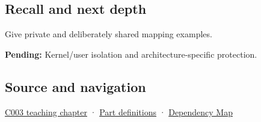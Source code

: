 \subsection{Recall and next depth}\label{appendix-c2a9ad1e2b49-recall-and-next-depth}

Give private and deliberately shared mapping examples.

\textbf{Pending:} Kernel/user isolation and architecture-specific protection.

\subsection{Source and navigation}\label{appendix-c2a9ad1e2b49-source-and-navigation}

\hyperref[01-foundations-i-ch002-where-the-bytes-live]{C003 teaching chapter} · \hyperref[appendix-fd090d982a15-m003---parts-41-60]{Part definitions} · \hyperref[appendix-4ad47bdd269a]{Dependency Map}
